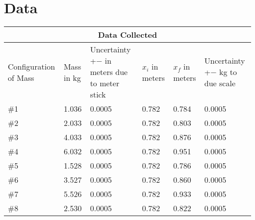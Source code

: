 {}
\chapter{Data}

\begin{tabular}{ |p{2cm}|p{2cm}|p{4cm}|p{2cm}|p{2cm}|p{2cm}| }
  \hline
  \multicolumn{6}{|c|}{Data Collected} \\
  \hline
  Configuration of Mass & Mass in kg & Uncertainty +$-$ in meters due to meter stick
  & $x_i$ in meters & $x_f$ in meters & Uncertainty +$-$ kg to due scale\\
  \hline
  \#1& 1.036 &  0.0005 & 0.782 & 0.784 & 0.0005\\
  \hline
  \#2& 2.033 &  0.0005 & 0.782 & 0.803 & 0.0005\\
  \hline
  \#3& 4.033 &  0.0005 & 0.782 & 0.876 & 0.0005\\
  \hline
  \#4& 6.032 &  0.0005 & 0.782 & 0.951 & 0.0005\\
  \hline
  \#5& 1.528 &  0.0005 & 0.782 & 0.786 & 0.0005\\
  \hline
  \#6& 3.527 &  0.0005 & 0.782 & 0.860 & 0.0005\\
  \hline
  \#7& 5.526 &  0.0005 & 0.782 & 0.933 & 0.0005\\
  \hline
  \#8& 2.530 &  0.0005 & 0.782 & 0.822 & 0.0005\\
  \hline
\end{tabular}

\restoregeometry